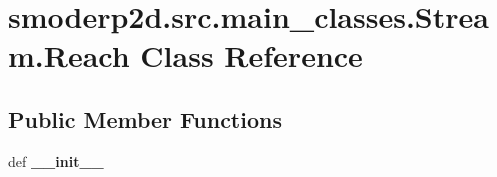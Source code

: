 \hypertarget{classsmoderp2d_1_1src_1_1main__classes_1_1Stream_1_1Reach}{\section{smoderp2d.\-src.\-main\-\_\-classes.\-Stream.\-Reach Class Reference}
\label{classsmoderp2d_1_1src_1_1main__classes_1_1Stream_1_1Reach}
}
\subsection*{Public Member Functions}
\begin{DoxyCompactItemize}
\item 
\hypertarget{classsmoderp2d_1_1src_1_1main__classes_1_1Stream_1_1Reach_af14efa37bb1c8fb9ec37a8bf0198da35}{def {\bfseries \-\_\-\-\_\-init\-\_\-\-\_\-}}\label{classsmoderp2d_1_1src_1_1main__classes_1_1Stream_1_1Reach_af14efa37bb1c8fb9ec37a8bf0198da35}

\end{DoxyCompactItemize}

